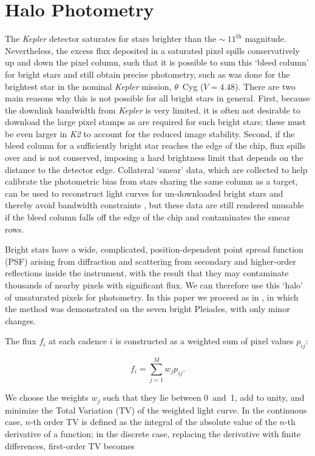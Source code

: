 \documentclass[modern]{aastex61}
\newcommand{\kepler}{\emph{Kepler}\xspace}
\newcommand{\ktwo}{\emph{K2}\xspace}
\begin{document}
\appendix

\section{Halo Photometry}
\label{halo}

The \kepler detector saturates for stars brighter than the $\sim~11^\text{th}$ magnitude. Nevertheless, the excess flux deposited in a saturated pixel spills conservatively up and down the pixel column, such that it is possible to sum this `bleed column' for bright stars and still obtain precise photometry, such as was done for the brightest star in the nominal \kepler mission, $\theta$~Cyg \citep{guzik2011,thetacygwhite,guzik2016} ($V = 4.48$). There are two main reasons why this is not possible for all bright stars in general. First, because the downlink bandwidth from \kepler is very limited, it is often not desirable to download the large pixel stamps as are required for such bright stars; these must be even larger in \ktwo to account for the reduced image stability. Second, if the bleed column for a sufficiently bright star reaches the edge of the chip, flux spills over and is not conserved, imposing a hard brightness limit that depends on the distance to the detector edge. 
Collateral `smear' data, which are collected to help calibrate the photometric bias from stars sharing the same column as a target, can be used to reconstruct light curves for un-downloaded bright stars and thereby avoid bandwidth constraints \citep{k2smear}, but these data are still rendered unusable if the bleed column falls off the edge of the chip and contaminates the smear rows.

Bright stars have a wide, complicated, position-dependent point spread function (PSF) arising from diffraction and scattering from secondary and higher-order reflections inside the instrument, with the result that they may contaminate thousands of nearby pixels with significant flux. We can therefore use this `halo' of unsaturated pixels for photometry. In this paper we proceed as in \citet{White2017}, in which the method was demonstrated on the seven bright Pleiades, with only minor changes.

The flux $f_i$ at each cadence $i$ is constructed as a weighted sum of pixel values $p_{ij}$:

\begin{equation}
	f_i = \sum_{j=1}^{M} w_j p_{ij}.
\end{equation}

\noindent We choose the weights $w_j$ such that they lie between 0~and~1, add to unity, and minimize the Total Variation (TV) of the weighted light curve. In the continuous case, $n$-th order TV is defined as the integral of the absolute value of the $n$-th derivative of a function; in the discrete case, replacing the derivative with finite differences, first-order TV becomes
\end{document}
